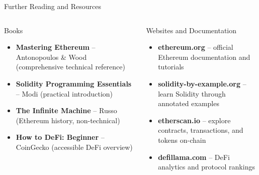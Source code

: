 \documentclass[8pt,aspectratio=169]{beamer}
\begin{document}
\begin{frame}{Further Reading and Resources}
\begin{columns}[T]
\begin{block}{\textcolor{mlblue}{Books}}
\footnotesize
\begin{itemize}
  \item \textbf{Mastering Ethereum} -- Antonopoulos \& Wood (comprehensive technical reference)
  \item \textbf{Solidity Programming Essentials} -- Modi (practical introduction)
  \item \textbf{The Infinite Machine} -- Russo (Ethereum history, non-technical)
  \item \textbf{How to DeFi: Beginner} -- CoinGecko (accessible DeFi overview)
\end{itemize}
\end{block}
\vspace{2mm}
\begin{block}{\textcolor{mlgreen}{Websites and Documentation}}
\footnotesize
\begin{itemize}
  \item \textbf{ethereum.org} -- official Ethereum documentation and tutorials
  \item \textbf{solidity-by-example.org} -- learn Solidity through annotated examples
  \item \textbf{etherscan.io} -- explore contracts, transactions, and tokens on-chain
  \item \textbf{defillama.com} -- DeFi analytics and protocol rankings
\end{itemize}
\end{block}


\end{columns}
\end{frame}
\end{document}

